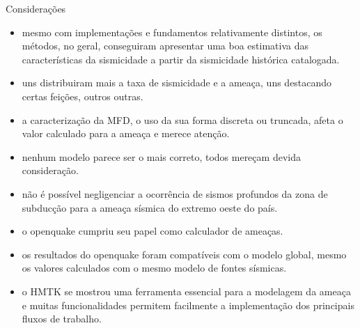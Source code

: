 \documentclass[ucs,8pt]{beamer}
\begin{document}
\begin{frame}{Considerações}
	\begin{itemize}
		\item mesmo com implementações e fundamentos relativamente distintos, os métodos, no geral, conseguiram apresentar
	uma boa estimativa das características da sismicidade a partir da sismicidade histórica catalogada.
		\item uns distribuiram mais a taxa de sismicidade e a ameaça, uns destacando certas feições, outros outras.
		\item a caracterização da MFD, o uso da sua forma discreta ou truncada, afeta o valor calculado para a
	ameaça e merece atenção.
		\item nenhum modelo parece ser o mais correto, todos mereçam devida consideração.
		\item não é possível negligenciar a ocorrência de sismos profundos da zona de subducção
	para a ameaça sísmica do extremo oeste do país.
		\item o openquake cumpriu seu papel como calculador de ameaças.
		\item os resultados do openquake foram compatíveis com o
	modelo global, mesmo os valores calculados com o mesmo modelo de fontes sísmicas.
		\item o HMTK se mostrou uma ferramenta essencial para a modelagem da ameaça e muitas funcionalidades permitem
		facilmente a implementação dos principais fluxos de trabalho.
	\end{itemize}
\end{frame}


\end{document}
